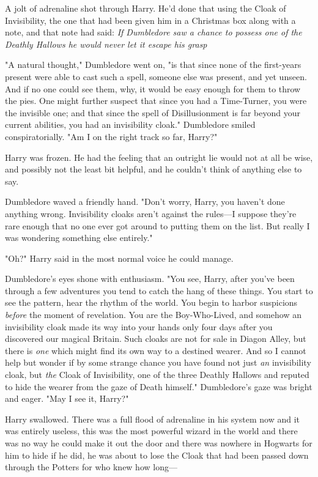 A jolt of adrenaline shot through Harry. He'd done that using the Cloak of
Invisibility, the one that had been given him in a Christmas box along with a
note, and that note had said: \emph{If Dumbledore saw a chance to possess one
of the Deathly Hallows he would never let it escape his grasp\el}

"A natural thought," Dumbledore went on, "is that since none of the first-years
present were able to cast such a spell, someone else was present, and yet
unseen. And if no one could see them, why, it would be easy enough for them to
throw the pies. One might further suspect that since you had a Time-Turner, you
were the invisible one; and that since the spell of Disillusionment is far
beyond your current abilities, you had an invisibility cloak." Dumbledore
smiled conspiratorially. "Am I on the right track so far, Harry?"

Harry was frozen. He had the feeling that an outright lie would not at all be
wise, and possibly not the least bit helpful, and he couldn't think of anything
else to say.

Dumbledore waved a friendly hand. "Don't worry, Harry, you haven't done
anything wrong. Invisibility cloaks aren't against the rules---I suppose
they're rare enough that no one ever got around to putting them on the list.
But really I was wondering something else entirely."

"Oh?" Harry said in the most normal voice he could manage.

Dumbledore's eyes shone with enthusiasm. "You see, Harry, after you've been
through a few adventures you tend to catch the hang of these things. You start
to see the pattern, hear the rhythm of the world. You begin to harbor
suspicions \emph{before} the moment of revelation. You are the Boy-Who-Lived,
and somehow an invisibility cloak made its way into your hands only four days
after you discovered our magical Britain. Such cloaks are not for sale in
Diagon Alley, but there is \emph{one} which might find its own way to a
destined wearer. And so I cannot help but wonder if by some strange chance you
have found not just \emph{an} invisibility cloak, but \emph{the} Cloak of
Invisibility, one of the three Deathly Hallows and reputed to hide the wearer
from the gaze of Death himself." Dumbledore's gaze was bright and eager. "May I
see it, Harry?"

Harry swallowed. There was a full flood of adrenaline in his system now and it
was entirely useless, this was the most powerful wizard in the world and there
was no way he could make it out the door and there was nowhere in Hogwarts for
him to hide if he did, he was about to lose the Cloak that had been passed down
through the Potters for who knew how long\mbox{---}

